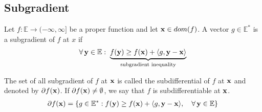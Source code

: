 \documentclass[11pt]{article}
\begin{document}
\subsection{Subgradient}
\begin{definition}
    Let $f: \mathbb{E} \to (-\infty,\infty]$ be a proper function and let ${\mathbf{x}} \in dom(f)$. A
    vector $g \in \mathbb{E}^{*}$ is a subgradient of $f$ at $x$ if 
    \begin{align*}
        \forall \, \vy \in \mathbb{E}: \; \underbrace{f(\vy) \ge f(\vx) + \langle g, \vy-\vx \rangle}
        _{\text{subgradient inequality}}
    \end{align*}
\end{definition}

The set of all subgradient of $f$ at ${\mathbf{x}}$ is called the subdifferential of $f$ at ${\mathbf{x}}$
and denoted by $\partial f({\mathbf{x}})$. If $\partial f({\mathbf{x}}) \neq \emptyset$,
 we say that $f$ is subdifferentiable at 
${\mathbf{x}}$.
\begin{align*}
    \partial f({\mathbf{x}}) = \{ g \in \mathbb{E}^{*}: f({\mathbf{y}}) \ge f({\mathbf{x}}) + \langle g,{\mathbf{y}}-{\mathbf{x}} \rangle 
    , \quad \forall \, {\mathbf{y}} \in \mathbb{E}\}
\end{align*}
\end{document}
